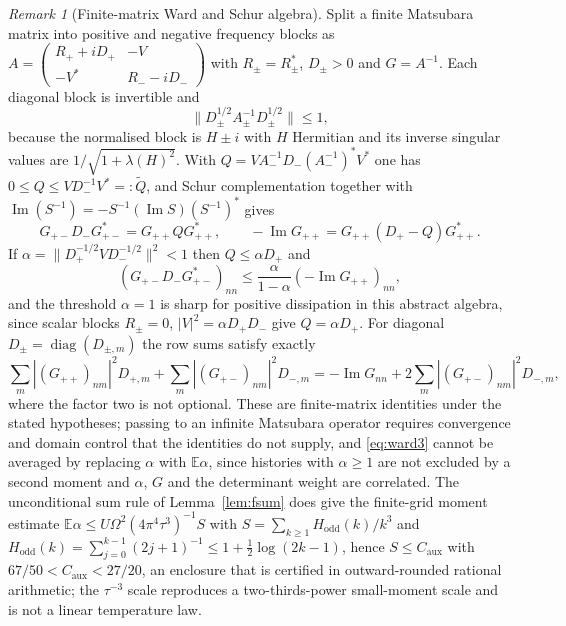 \documentclass[11pt]{article}
\theoremstyle{definition}
\theoremstyle{remark}
\newtheorem{remark}[theorem]{Remark}
\DeclareMathOperator{\diag}{diag}
\newcommand{\E}{\mathbb{E}}
\begin{document}
\begin{remark}[Finite-matrix Ward and Schur algebra]
\label{rem:ward}
Split a finite Matsubara matrix into positive and negative frequency blocks as
$A=\begin{pmatrix}R_++iD_+&-V\\ -V^*&R_- -iD_-\end{pmatrix}$ with
$R_\pm=R_\pm^*$, $D_\pm>0$ and $G=A^{-1}$. Each diagonal block is invertible and
\begin{equation}
\bigl\|D_\pm^{1/2}A_\pm^{-1}D_\pm^{1/2}\bigr\|\le1,
\label{eq:ward1}
\end{equation}
because the normalised block is $H\pm i$ with $H$ Hermitian and its inverse singular
values are $1/\sqrt{1+\lambda(H)^2}$. With
$Q=VA_-^{-1}D_-(A_-^{-1})^*V^*$ one has $0\le Q\le VD_-^{-1}V^*=:\tilde Q$, and Schur
complementation together with $\operatorname{Im}(S^{-1})=-S^{-1}(\operatorname{Im}S)
(S^{-1})^*$ gives
\begin{equation}
G_{+-}D_-G_{+-}^*=G_{++}QG_{++}^*,\qquad
-\operatorname{Im}G_{++}=G_{++}(D_+-Q)G_{++}^* .
\label{eq:ward2}
\end{equation}
If $\alpha=\|D_+^{-1/2}VD_-^{-1/2}\|^2<1$ then $Q\le\alpha D_+$ and
\begin{equation}
\left(G_{+-}D_-G_{+-}^*\right)_{nn}\le\frac{\alpha}{1-\alpha}
\left(-\operatorname{Im}G_{++}\right)_{nn},
\label{eq:ward3}
\end{equation}
and the threshold $\alpha=1$ is sharp for positive dissipation in this abstract
algebra, since scalar blocks $R_\pm=0$, $|V|^2=\alpha D_+D_-$ give $Q=\alpha D_+$.
For diagonal $D_\pm=\diag(D_{\pm,m})$ the row sums satisfy exactly
\begin{equation}
\sum_m|(G_{++})_{nm}|^2D_{+,m}+\sum_m|(G_{+-})_{nm}|^2D_{-,m}
=-\operatorname{Im}G_{nn}+2\sum_m|(G_{+-})_{nm}|^2D_{-,m},
\label{eq:ward4}
\end{equation}
where the factor two is not optional. These are finite-matrix identities under the
stated hypotheses; passing to an infinite Matsubara operator requires convergence and
domain control that the identities do not supply, and \eqref{eq:ward3} cannot be
averaged by replacing $\alpha$ with $\E\alpha$, since histories with $\alpha\ge1$ are
not excluded by a second moment and $\alpha$, $G$ and the determinant weight are
correlated. The unconditional sum rule of Lemma~\ref{lem:fsum} does give the
finite-grid moment estimate
$\E\alpha\le U\Omega^2(4\pi^4\tau^3)^{-1}S$ with
$S=\sum_{k\ge1}H_{\mathrm{odd}}(k)/k^3$ and
$H_{\mathrm{odd}}(k)=\sum_{j=0}^{k-1}(2j+1)^{-1}\le1+\tfrac12\log(2k-1)$, hence
$S\le C_{\mathrm{aux}}$ with $67/50<C_{\mathrm{aux}}<27/20$, an enclosure that is
certified in outward-rounded rational arithmetic; the $\tau^{-3}$ scale
reproduces a two-thirds-power small-moment scale and is not a linear temperature law.
\end{remark}
\end{document}
